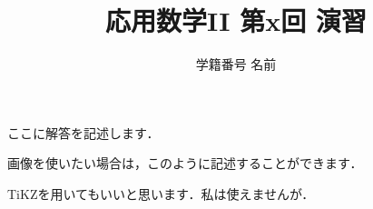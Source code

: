 \documentclass[platex,dvipdfmx]{jlreq}			%
\title{応用数学II 第x回 演習}
\author{学籍番号 名前}
\date{\empty}
\begin{document}
\maketitle



ここに解答を記述します．

画像を使いたい場合は，このように記述することができます．


TiKZを用いてもいいと思います．私は使えませんが．
\end{document}

